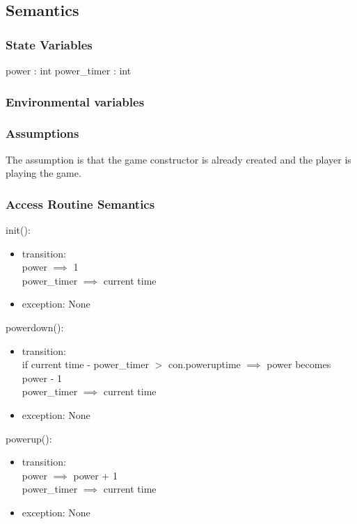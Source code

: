 \documentclass[12pt, titlepage]{article}
\begin{document}
\subsection {Semantics}

\subsubsection {State Variables}

power : int
power\_timer : int

\subsubsection {Environmental variables}

\subsubsection {Assumptions}
The assumption is that the game constructor is already created and the player is playing the game.

\subsubsection {Access Routine Semantics}

\noindent init(): 
\begin{itemize}
\item transition:\\
power $\implies$ 1\\
power\_timer $\implies$ current time\\
\item exception: None
\end{itemize}

\noindent powerdown(): 
\begin{itemize}
\item transition:\\
if current time - power\_timer $>$ con.poweruptime $\implies$ power becomes power - 1\\
power\_timer $\implies$ current time\\
\item exception: None
\end{itemize}

\noindent powerup(): 
\begin{itemize}
\item transition:\\
power $\implies$ power + 1\\
power\_timer $\implies$ current time\\
\item exception: None
\end{itemize}
\end{document}
